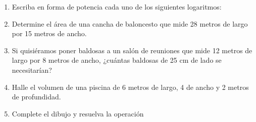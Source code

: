 \documentclass[fleqn]{article}
\begin{document}
\begin{enumerate}
\begin{enumerate}
\end{enumerate}
\newpage
\item Escriba en forma de potencia cada uno de los siguientes logaritmos:
  \begin{enumerate}
  \end{enumerate}
  \item Determine el área de una cancha de baloncesto que mide 28 metros de largo por 15 metros de ancho.\noanswer
  \item Si quisiéramos poner baldosas a un salón de reuniones que mide 12 metros de largo por 8 metros de ancho, ¿cuántas baldosas de 25 cm de lado se necesitarían?\noanswer
  \item Halle el volumen de una piscina de 6 metros de largo, 4 de ancho y 2 metros de profundidad.\noanswer
   \item Complete el dibujo y resuelva la operación
 

\end{enumerate}
\end{document}
